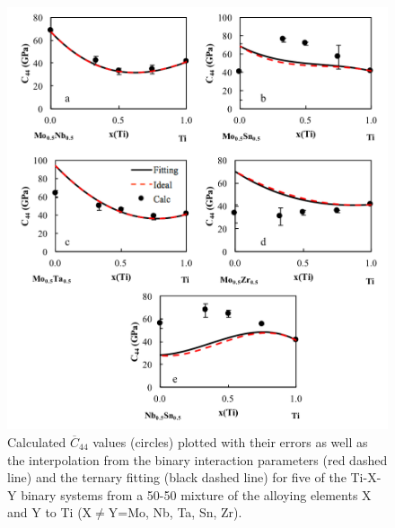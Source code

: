 \pagebreak
\begin{figure}[H]
	\centering
	\includegraphics[width=\textwidth]{Chapter-6/Figures/tixyc44_1.png}
	\caption{Calculated $\overline{C}_{44}$ values (circles) plotted with their errors as well as the interpolation from the binary interaction parameters (red dashed line) and the ternary fitting (black dashed line) for five of the Ti-X-Y binary systems from a 50-50 mixture of the alloying elements X and Y to Ti (X$\neq$Y=Mo, Nb, Ta, Sn, Zr).}
	\label{Ch6-figure:tixyc44_1}
\end{figure}

